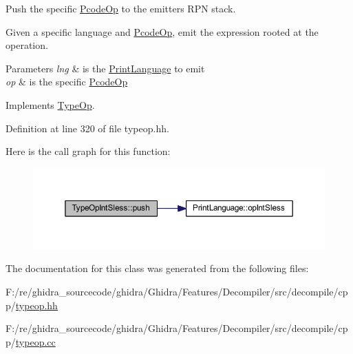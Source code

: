Push the specific \mbox{\hyperlink{class_pcode_op}{Pcode\+Op}} to the emitter\textquotesingle{}s R\+PN stack. 

Given a specific language and \mbox{\hyperlink{class_pcode_op}{Pcode\+Op}}, emit the expression rooted at the operation. 
\begin{DoxyParams}{Parameters}
{\em lng} & is the \mbox{\hyperlink{class_print_language}{Print\+Language}} to emit \\
\hline
{\em op} & is the specific \mbox{\hyperlink{class_pcode_op}{Pcode\+Op}} \\
\hline
\end{DoxyParams}


Implements \mbox{\hyperlink{class_type_op_ac9c9544203ed74dabe6ac662b653b2af}{Type\+Op}}.



Definition at line 320 of file typeop.\+hh.

Here is the call graph for this function\+:
\nopagebreak
\begin{figure}[H]
\begin{center}
\leavevmode
\includegraphics[width=350pt]{class_type_op_int_sless_a3b88a12e1da476a9d382cd9843ca7df5_cgraph}
\end{center}
\end{figure}


The documentation for this class was generated from the following files\+:\begin{DoxyCompactItemize}
\item 
F\+:/re/ghidra\+\_\+sourcecode/ghidra/\+Ghidra/\+Features/\+Decompiler/src/decompile/cpp/\mbox{\hyperlink{typeop_8hh}{typeop.\+hh}}\item 
F\+:/re/ghidra\+\_\+sourcecode/ghidra/\+Ghidra/\+Features/\+Decompiler/src/decompile/cpp/\mbox{\hyperlink{typeop_8cc}{typeop.\+cc}}\end{DoxyCompactItemize}
